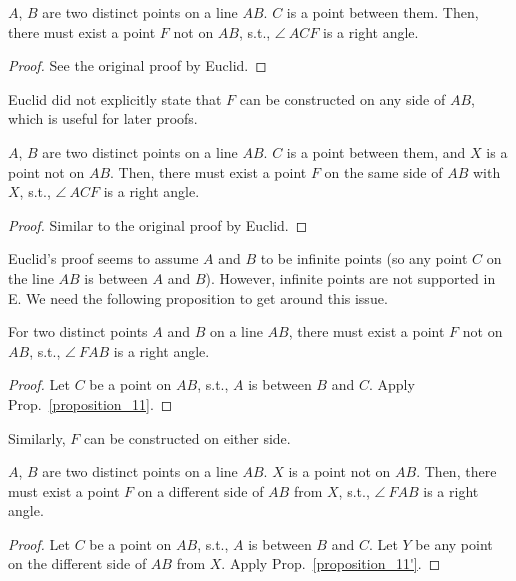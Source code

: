 \begin{proposition}\label{proposition_11}\leanok
    $A$, $B$ are two distinct points on a line $AB$. $C$ is a point between them. Then, there must exist a point $F$ not on $AB$, s.t., $\angle~ACF$ is a right angle.
\end{proposition}
\begin{proof}
    \leanok
    See the original proof by Euclid.
\end{proof}

Euclid did not explicitly state that $F$ can be constructed on any side of $AB$, which is useful for later proofs.

\begin{proposition}\label{proposition_11'}\leanok
    $A$, $B$ are two distinct points on a line $AB$. $C$ is a point between them, and $X$ is a point not on $AB$. Then, there must exist a point $F$ on the same side of $AB$ with $X$, s.t., $\angle~ACF$ is a right angle.
\end{proposition}
\begin{proof}
    \leanok
    Similar to the original proof by Euclid.
\end{proof}

Euclid's proof seems to assume $A$ and $B$ to be infinite points (so any point $C$ on the line $AB$ is between $A$ and $B$). However, infinite points are not supported in E. We need the following proposition to get around this issue.

\begin{proposition}\label{proposition_11''}\leanok
    For two distinct points $A$ and $B$ on a line $AB$, there must exist a point $F$ not on $AB$, s.t., $\angle~FAB$ is a right angle.
\end{proposition}
\begin{proof}
    \leanok
    Let $C$ be a point on $AB$, s.t., $A$ is between $B$ and $C$. Apply Prop.~\ref{proposition_11}.
\end{proof}

Similarly, $F$ can be constructed on either side.


\begin{proposition}\label{proposition_11'''}\leanok
    $A$, $B$ are two distinct points on a line $AB$. $X$ is a point not on $AB$. Then, there must exist a point $F$ on a different side of $AB$ from $X$, s.t., $\angle~FAB$ is a right angle.
\end{proposition}
\begin{proof}
    \leanok
    Let $C$ be a point on $AB$, s.t., $A$ is between $B$ and $C$. Let $Y$ be any point on the different side of $AB$ from $X$. Apply Prop.~\ref{proposition_11'}.
\end{proof}
